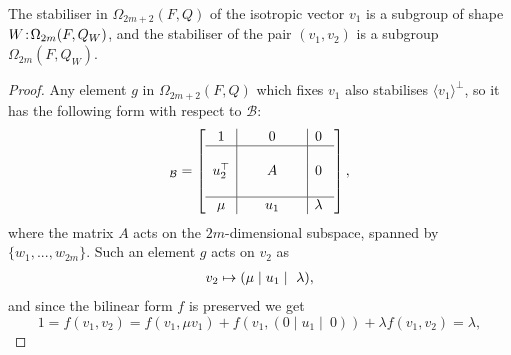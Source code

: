 \begin{lemma}
    \label{lemma:A_stabiliser_omega}
	The stabiliser in $\Omega_{2m+2}(F,Q)$ of the isotropic vector $v_1$ 
	is a subgroup of shape \mbox{$W\mathord{{\;\!{:}\;\!}}\Omega_{2m}(F,Q_W)$}, and the stabiliser of 
	the pair $(v_1,v_2)$ is a subgroup $\Omega_{2m}(F,Q_W)$.  
\end{lemma}

\begin{proof}
	Any element $g$ in $\Omega_{2m+2}(F,Q)$ which fixes $v_1$ also stabilises
    $\langle v_1 \rangle^{\perp}$, so it has the
    following form with respect to $\mathcal{B}$:
    \begin{equation*}
	[g]_{\mathcal{B}}=\left[
	    \begin{array}{c|c|c}
		1 & 0 & 0\  \\ \hline 
		 & & \\
		u_2^\T &\ \ \ \ \ A\ \ \ \ \  & 0\  \\ 
		 & & \\ \hline 
		\mu & u_1 & \lambda\ 
	    \end{array}
	\right],
    \end{equation*}
    where the matrix $A$ acts on the $2m$-dimensional subspace, 
    spanned by $\{w_1, ..., w_{2m}\}$. Such an element $g$ acts on $v_2$ as
    \begin{equation*}
	\begin{array}{r@{\;}c@{\;}l}
		v_2 & \mapsto & (\mu \mid u_1 \mid\ \lambda),
	\end{array}
    \end{equation*}
    and since the bilinear form $f$ is preserved we get
    \begin{equation*}
	1 = f(v_1,v_2) = f(v_1,\mu v_1) + 
	f(v_1, (0 \mid u_1 \mid\ 0) ) + \lambda f(v_1,v_2) = \lambda,
    \end{equation*}
    

\end{proof}
